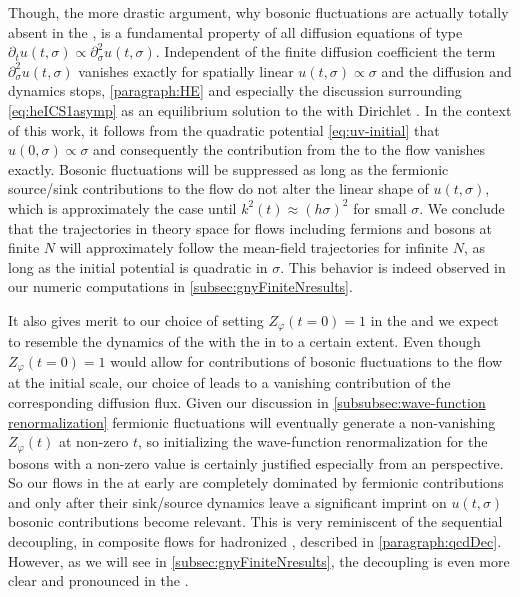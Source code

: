 Though, the more drastic argument, why bosonic fluctuations are actually totally absent in the \uv{}, is a fundamental property of all diffusion equations of type $\partial_t u ( t, \sigma ) \propto \partial_\sigma^2 u ( t, \sigma )$. Independent of the finite diffusion coefficient the term $\partial_\sigma^2 u( t, \sigma ) $ vanishes exactly for spatially linear $u ( t, \sigma ) \propto \sigma$ and the diffusion and dynamics stops, \cf{} \cref{paragraph:HE} and especially the discussion surrounding \cref{eq:heICS1asymp} as an equilibrium solution to the \heq{} with Dirichlet \bcs{}.
In the context of this work, it follows from the quadratic \uv{} potential \eqref{eq:uv-initial} that $u ( 0, \sigma ) \propto \sigma$ and consequently the contribution from the \sigmaMode{} to the \frg{} flow vanishes exactly.
Bosonic fluctuations will be suppressed as long as the fermionic source/sink contributions to the \frg{} flow do not alter the linear shape of $u ( t, \sigma )$, which is approximately the case until $k^2 ( t ) \approx ( h \sigma )^2$ for small $\sigma$. 
We conclude that the \frg{} trajectories in theory space for \frg{} flows including fermions and bosons at finite $N$ will approximately follow the mean-field \frg{} trajectories for infinite $N$, as long as the \uv{} initial potential is quadratic in $\sigma$.
This behavior is indeed observed in our numeric computations in \cref{subsec:gnyFiniteNresults}.

It also gives merit to our choice of setting $Z_\varphi ( t=0 ) = 1$ in the \uv{} and we expect to resemble the dynamics of the \gnm{} with the \gnym{} in \lpa{} to a certain extent.
Even though $Z_\varphi ( t=0 ) = 1$ would allow for contributions of bosonic fluctuations to the \frg{} flow at the initial scale, our choice of \uv{} \ic{} leads to a vanishing contribution of the corresponding diffusion flux.
Given our discussion in \cref{subsubsec:wave-function renormalization} fermionic fluctuations will eventually generate a non-vanishing $Z_\varphi (t)$ at non-zero $t$, so initializing the wave-function renormalization for the bosons with a non-zero value is certainly justified especially from an \rgcy{} perspective.
So our flows in the \gnym{} at early \rgtimes{} are completely dominated by fermionic contributions and only after their sink/source dynamics leave a significant imprint on $u(t,\sigma)$ bosonic contributions become relevant.
This is very reminiscent of the sequential decoupling, in composite \frg{} flows for hadronized \qcd{}, described in \cref{paragraph:qcdDec}.
However, as we will see in \cref{subsec:gnyFiniteNresults}, the decoupling is even more clear and pronounced in the \gnym{}.

